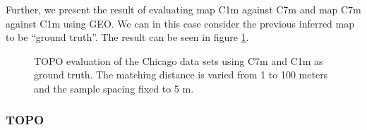 Further, we present the result of evaluating map C1m against C7m and map C7m against C1m using GEO. We can in this case consider the previous inferred map to be ``ground truth''. The result can be seen in figure \ref{fig:results/geo_match_dist_chch}.
\begin{figure}[H]%
  \caption{TOPO evaluation of the Chicago data sets using C7m and C1m as ground truth. The matching distance is varied from 1 to 100 meters and the sample spacing fixed to 5 m.}%
 \label{fig:results/geo_match_dist_chch}
\end{figure}

\subsubsection{TOPO}

